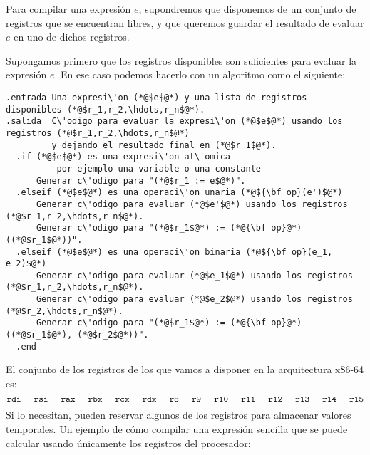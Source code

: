 \documentclass{article}
\begin{document}
Para compilar una expresi\'on $e$, supondremos que
disponemos de un conjunto de registros que se encuentran
libres, y que queremos guardar el resultado de evaluar $e$
en uno de dichos registros.

Supongamos primero que los registros disponibles son suficientes
para evaluar la expresi\'on $e$. En ese caso podemos hacerlo con
un algoritmo como el siguiente:
\begin{lstlisting}
.entrada Una expresi\'on (*@$e$@*) y una lista de registros disponibles (*@$r_1,r_2,\hdots,r_n$@*).
.salida  C\'odigo para evaluar la expresi\'on (*@$e$@*) usando los registros (*@$r_1,r_2,\hdots,r_n$@*)
         y dejando el resultado final en (*@$r_1$@*).
  .if (*@$e$@*) es una expresi\'on at\'omica
          por ejemplo una variable o una constante
      Generar c\'odigo para "(*@$r_1 := e$@*)".
  .elseif (*@$e$@*) es una operaci\'on unaria (*@${\bf op}(e')$@*)
      Generar c\'odigo para evaluar (*@$e'$@*) usando los registros (*@$r_1,r_2,\hdots,r_n$@*).
      Generar c\'odigo para "(*@$r_1$@*) := (*@{\bf op}@*)((*@$r_1$@*))".
  .elseif (*@$e$@*) es una operaci\'on binaria (*@${\bf op}(e_1, e_2)$@*)
      Generar c\'odigo para evaluar (*@$e_1$@*) usando los registros (*@$r_1,r_2,\hdots,r_n$@*).
      Generar c\'odigo para evaluar (*@$e_2$@*) usando los registros (*@$r_2,\hdots,r_n$@*).
      Generar c\'odigo para "(*@$r_1$@*) := (*@{\bf op}@*)((*@$r_1$@*), (*@$r_2$@*))".
  .end
\end{lstlisting}

El conjunto de los registros de los que vamos a disponer
en la arquitectura x86-64 es:
$$
\texttt{rdi}
\hspace{.5cm}
\texttt{rsi}
\hspace{.5cm}
\texttt{rax}
\hspace{.5cm}
\texttt{rbx}
\hspace{.5cm}
\texttt{rcx}
\hspace{.5cm}
\texttt{rdx}
\hspace{.5cm}
\texttt{r8}
\hspace{.5cm}
\texttt{r9}
\hspace{.5cm}
\texttt{r10}
\hspace{.5cm}
\texttt{r11}
\hspace{.5cm}
\texttt{r12}
\hspace{.5cm}
\texttt{r13}
\hspace{.5cm}
\texttt{r14}
\hspace{.5cm}
\texttt{r15}
$$
Si lo necesitan, pueden reservar algunos de los registros
para almacenar valores temporales.
Un ejemplo de c\'omo compilar una expresi\'on sencilla
que se puede calcular usando \'unicamente los registros
del procesador:
\end{document}

